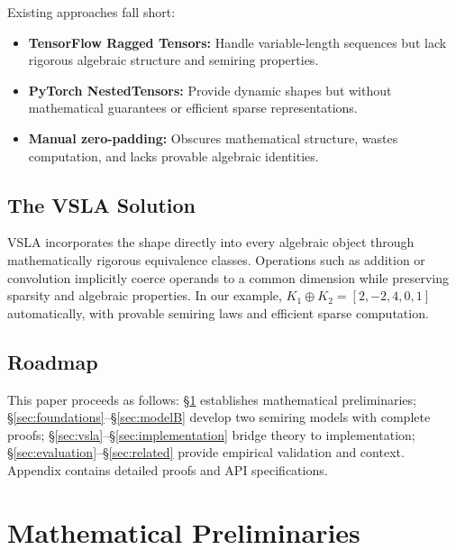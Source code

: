 \documentclass[11pt]{article}
\begin{document}
Existing approaches fall short:
\begin{itemize}[leftmargin=1.5em]
\item \textbf{TensorFlow Ragged Tensors:} Handle variable-length sequences but lack rigorous algebraic structure and semiring properties.
\item \textbf{PyTorch NestedTensors:} Provide dynamic shapes but without mathematical guarantees or efficient sparse representations.
\item \textbf{Manual zero-padding:} Obscures mathematical structure, wastes computation, and lacks provable algebraic identities.
\end{itemize}

\subsection{The VSLA Solution}
VSLA incorporates the shape directly into every algebraic object through mathematically rigorous equivalence classes.  Operations such as addition or convolution implicitly coerce operands to a common dimension while preserving sparsity and algebraic properties. In our example, $K_1 \oplus K_2 = [2, -2, 4, 0, 1]$ automatically, with provable semiring laws and efficient sparse computation.

\subsection{Roadmap}
This paper proceeds as follows: §\ref{sec:prelim} establishes mathematical preliminaries; §\ref{sec:foundations}–§\ref{sec:modelB} develop two semiring models with complete proofs; §\ref{sec:vsla}–§\ref{sec:implementation} bridge theory to implementation; §\ref{sec:evaluation}–§\ref{sec:related} provide empirical validation and context. Appendix contains detailed proofs and API specifications.

\clearpage %

\section{Mathematical Preliminaries}
\label{sec:prelim}
\end{document}
